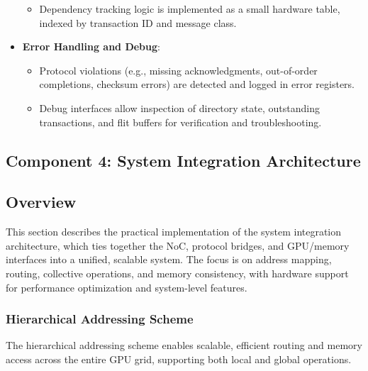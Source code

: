 \documentclass[11pt,a4paper]{article}
\begin{document}
\begin{itemize}
\begin{itemize}
        \item Dependency tracking logic is implemented as a small hardware table, indexed by transaction ID and message class.
    \end{itemize}
    \item \textbf{Error Handling and Debug}:
    \begin{itemize}
        \item Protocol violations (e.g., missing acknowledgments, out-of-order completions, checksum errors) are detected and logged in error registers.
        \item Debug interfaces allow inspection of directory state, outstanding transactions, and flit buffers for verification and troubleshooting.
    \end{itemize}
\end{itemize}

\subsection{Component 4: System Integration Architecture}

\subsection*{Overview}
This section describes the practical implementation of the system integration architecture, which ties together the NoC, protocol bridges, and GPU/memory interfaces into a unified, scalable system. The focus is on address mapping, routing, collective operations, and memory consistency, with hardware support for performance optimization and system-level features.

\subsubsection{Hierarchical Addressing Scheme}

The hierarchical addressing scheme enables scalable, efficient routing and memory access across the entire GPU grid, supporting both local and global operations.
\end{document}
